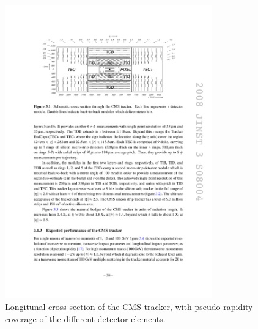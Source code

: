 \begin{figure}
\begin{center}
\includegraphics[angle=-0,width=0.8\textwidth]{2_LHC_and_CMS/pics/trkxsec.pdf}
\caption{Longitunal cross section of the CMS tracker, with pseudo rapidity coverage of the different detector elements. 
\label{fig:tracker}
}
\end{center}
\end{figure}

